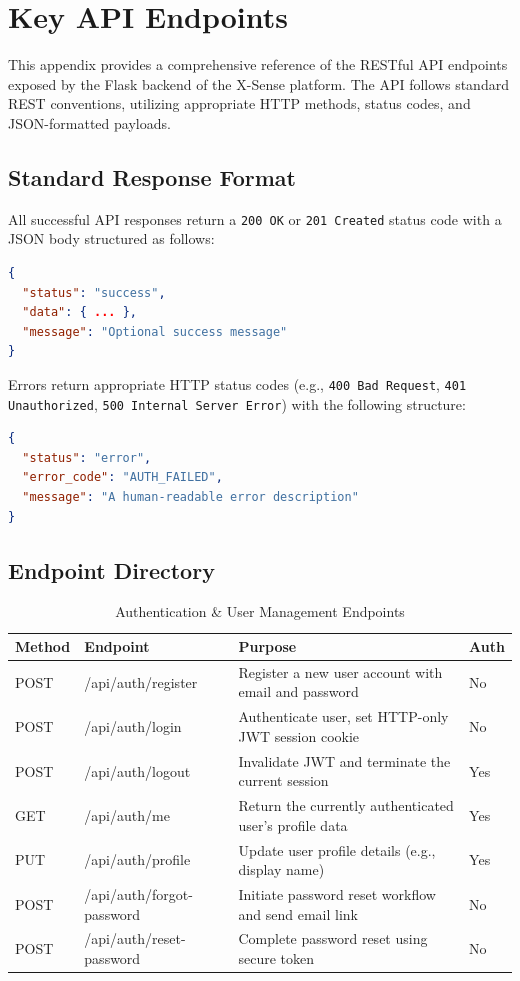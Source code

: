 \documentclass[12pt, a4paper]{report}
\begin{document}
\appendix

\chapter{Key API Endpoints}
\label{app:api-endpoints}

This appendix provides a comprehensive reference of the RESTful API endpoints exposed by the Flask backend of the X-Sense platform. The API follows standard REST conventions, utilizing appropriate HTTP methods, status codes, and JSON-formatted payloads. 

\section*{Standard Response Format}
All successful API responses return a \texttt{200 OK} or \texttt{201 Created} status code with a JSON body structured as follows:
\begin{lstlisting}[language=json]
{
  "status": "success",
  "data": { ... },
  "message": "Optional success message"
}
\end{lstlisting}

Errors return appropriate HTTP status codes (e.g., \texttt{400 Bad Request}, \texttt{401 Unauthorized}, \texttt{500 Internal Server Error}) with the following structure:
\begin{lstlisting}[language=json]
{
  "status": "error",
  "error_code": "AUTH_FAILED",
  "message": "A human-readable error description"
}
\end{lstlisting}

\section*{Endpoint Directory}

\begin{table}[H]
\centering
\caption{Authentication \& User Management Endpoints}
\label{tab:api-auth}
\small
\begin{tabularx}{\textwidth}{|l|l|X|l|}
\hline
\textbf{Method} & \textbf{Endpoint} & \textbf{Purpose} & \textbf{Auth} \\
\hline
POST & /api/auth/register & Register a new user account with email and password & No \\
\hline
POST & /api/auth/login & Authenticate user, set HTTP-only JWT session cookie & No \\
\hline
POST & /api/auth/logout & Invalidate JWT and terminate the current session & Yes \\
\hline
GET  & /api/auth/me & Return the currently authenticated user's profile data & Yes \\
\hline
PUT  & /api/auth/profile & Update user profile details (e.g., display name) & Yes \\
\hline
POST & /api/auth/forgot-password & Initiate password reset workflow and send email link & No \\
\hline
POST & /api/auth/reset-password & Complete password reset using secure token & No \\
\hline
\end{tabularx}
\end{table}
\end{document}
